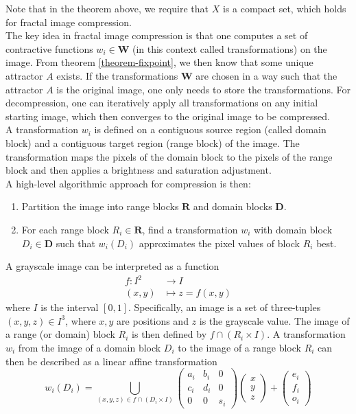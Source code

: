 Note that in the theorem above, we require that $X$ is a compact set, which holds for fractal image compression.
\\
The key idea in fractal image compression is that one computes a set of contractive functions $w_i \in \boldsymbol{W}$ (in this context called transformations) on the image.
From theorem \ref{theorem-fixpoint}, we then know that some unique attractor $A$ exists. If the transformations $\boldsymbol{W}$ are chosen in a way such that the attractor $A$ is the original image,
one only needs to store the transformations. For decompression, one can iteratively apply all transformations on any initial starting image, which then converges to the original image to be compressed.\\
A transformation $w_i$ is defined on a contiguous source region (called domain block) and a contiguous target region (range block) of the image.
The transformation maps the pixels of the domain block to the pixels of the range block and then applies a brightness and saturation adjustment.\\
A high-level algorithmic approach for compression is then:
\begin{enumerate}
    \item Partition the image into range blocks $\boldsymbol{R}$ and domain blocks $\boldsymbol{D}$.
    \item For each range block $R_i \in \boldsymbol{R}$, find a transformation $w_i$ with domain block $D_i \in \boldsymbol{D}$
            such that $w_i(D_i)$ approximates the pixel values of block $R_i$ best.
\end{enumerate}
A grayscale image can be interpreted as a function
\begin{align*}
    f \colon I^2 &\to I\\
    (x,y) &\mapsto z = f(x,y)
\end{align*}
where $I$ is the interval $[0,1]$. Specifically, an image is a set of three-tuples $(x,y,z) \in I^3$, where $x,y$ are positions and $z$ is the grayscale value.
The image of a range (or domain) block $R_i$ is then defined by $f \cap (R_i \times I)$.
A transformation $w_i$ from the image of a domain block $D_i$ to the image of a range block $R_i$ can then be described as a linear affine transformation
$$
w_i(D_i) = \bigcup_{(x,y,z) \in f \cap (D_i \times I)} \begin{pmatrix} a_i & b_i & 0 \\ c_i & d_i & 0 \\ 0 & 0 & s_i \end{pmatrix} \begin{pmatrix} x\\y\\z \end{pmatrix} + \begin{pmatrix} e_i\\f_i\\o_i \end{pmatrix}
$$
